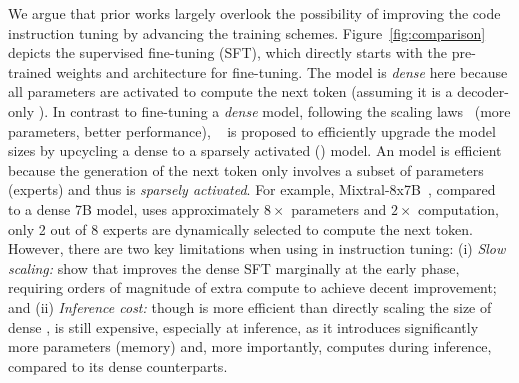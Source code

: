We argue that prior works largely overlook the possibility of improving the code instruction tuning by advancing the training schemes.
Figure~\ref{fig:comparison} depicts the supervised fine-tuning (SFT), which directly starts with the pre-trained weights and architecture for fine-tuning.
The model is \emph{dense} here because all parameters are activated to compute the next token (assuming it is a decoder-only \llm{}).
In contrast to fine-tuning a \emph{dense} model, 
following the scaling laws~\cite{kaplan2020scaling} (\ie more parameters, better performance),
\sparseupcycle~\cite{komatsuzaki2023sparse} is proposed to efficiently upgrade the model sizes by upcycling a dense \llm to a sparsely activated \moefull (\moe) model.
An \moe model is efficient because the generation of the next token only involves a subset of parameters (\ie experts) and thus is \emph{sparsely activated}.
For example, Mixtral-8x7B~\cite{jiang2024mixtral}, compared to a dense 7B model, 
uses approximately $8\times$ parameters and $2\times$ computation, \ie only 2 out of 8 experts are dynamically selected to compute the next token.
However, there are two key limitations when using \sparseupcycle in instruction tuning:
(i) \emph{Slow scaling:} \citet{komatsuzaki2023sparse} show that \sparseupcycle improves the dense SFT marginally at the early phase, requiring orders of magnitude of extra compute to achieve decent improvement;
and (ii) \emph{Inference cost:}
though \moe is more efficient than directly scaling the size of dense ,
\moe is still expensive, especially at inference, 
as it introduces significantly more parameters (\ie memory) and, more importantly, computes during inference, compared to its dense counterparts.

